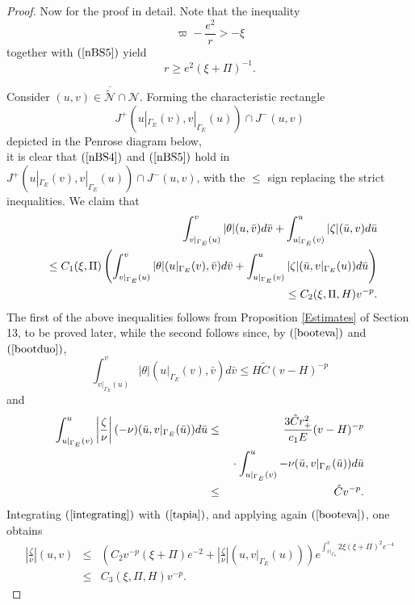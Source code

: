 \documentclass{article}
\newcommand{\zn}{\frac{\zeta}{\nu}}
\begin{document}
{\begin{proof}
Now for the proof in detail.
Note that the inequality
\begin{equation}
\label{3ava}
\varpi-\frac{e^2}{r}>-\xi
\end{equation}
together with $(\ref{nBS5})$ yield
\begin{equation}
\label{rbd}
r\ge e^2(\xi+\Pi)^{-1}.
\end{equation}

Consider $(u,v)\in\overline{\tilde{\mathcal{N}}}\cap \mathcal{N}$. 
Forming the characteristic rectangle
\[
J^+(u|_{\Gamma_E}(v),v|_{\Gamma_E}(u))\cap J^-(u,v)
\]
depicted
in the Penrose diagram below,
\[

\]
it is clear that $(\ref{nBS4})$ and $(\ref{nBS5})$ hold in
$J^+(u|_{\Gamma_E}(v),v|_{\Gamma_E}(u))\cap J^-(u,v)$, 
with the $\le$ sign replacing
the strict inequalities.
We claim that
\begin{eqnarray}
\label{tapia}
\nonumber
\int_{v|_{\Gamma_E}(u)}^v{|\theta|(u,\bar{v})d\bar{v}}
+\int_{u|_{\Gamma_E}(v)}^u{|\zeta|(\bar{u},v)d\bar{u}}\\
\nonumber
\hbox{\ }\le C_1(\xi,\Pi)\left(
\int_{v|_{\Gamma_E}(u)}^v{|\theta|(u|_{\Gamma_E}(v),\bar{v})d\bar{v}}
+\int_{u|_{\Gamma_E}(v)}^u{|\zeta|(\bar{u},v|_{\Gamma_E}(u))d\bar{u}}\right)\\
\hbox{\ }\le C_2(\xi,\Pi,H)v^{-p}.
\end{eqnarray}
The first of the above inequalities follows
from Proposition \ref{Estimates} of Section 13, to
be proved later,
while the second follows since, by $(\ref{booteva})$ and $(\ref{bootduo})$,
\[
\int_{v|_{\Gamma_E}(u)}^v|\theta|(u|_{\Gamma_E}(v),\bar{v})d\bar{v}
\le H\tilde{C}(v-H)^{-p}
\]
and
\begin{eqnarray*}
\int_{u|_{\Gamma_E}(v)}^u
{\left|\zn\right|(-\nu)(\bar{u},v|_{\Gamma_E}(\bar{u}))d\bar{u}}
&\le& \frac{3\tilde{C}r_+^2}{c_1E}(v-H)^{-p}\\
&&\hbox{}\cdot
\int_{u|_{\Gamma_E}(v)}^u{-\nu(\bar{u},v|_{\Gamma_E}(\bar{u}))d\bar{u}}\\
&\le& \hat{C}v^{-p}.
\end{eqnarray*}
Integrating $(\ref{integrating})$ with $(\ref{tapia})$, and applying
again $(\ref{booteva})$, one
obtains
\begin{eqnarray}
\label{yineyildiz}
\nonumber
\left|\zn\right|(u,v)&\le& \left(C_2v^{-p}(\xi+\Pi)e^{-2}
+\left|\zn\right|(u,v|_{\Gamma_{E}}(u))\right)
e^{\int_{v|_{\Gamma_{E}}}^v{2\xi
(\xi+\Pi)^2e^{-4}}}\\
&\le&C_3(\xi,\Pi,H)v^{-p}.
\end{eqnarray}

\end{proof}}
\end{document}
